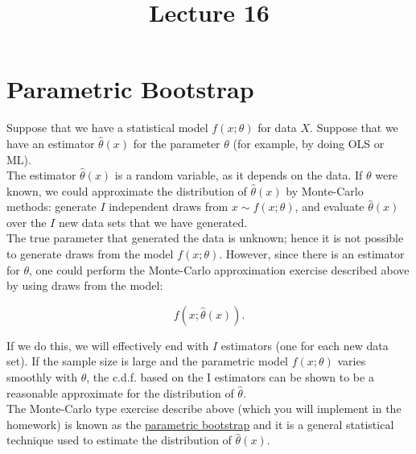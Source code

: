 \documentclass[12] {article}
\begin{document}
\onehalfspace

\title{Lecture 16}
\date{}
\maketitle


\section{Parametric Bootstrap}

Suppose that we have a statistical model $f(x; \theta)$ for data $X$. Suppose that we have an estimator $\widehat{\theta}(x)$ for the parameter $\theta$ (for example, by doing OLS or ML). \\

The estimator $\widehat{\theta}(x)$ is a random variable, as it depends on the data. If $\theta$ were known, we could approximate the distribution of $\widehat{\theta}(x)$ by Monte-Carlo methods: generate $I$ independent draws from $x \sim f(x;\theta)$, and evaluate $\widehat{\theta}(x)$ over the $I$ new data sets that we have generated.  \\


The true parameter that generated the data is unknown; hence it is not possible to generate draws from the model $f(x;\theta)$. However, since there is an estimator for $\theta$, one could perform the Monte-Carlo approximation exercise described above by using draws from the model:

\[ f(x; \widehat{\theta}(x)).\]

If we do this, we will effectively end with $I$ estimators (one for each new data set). If the sample size is large and the parametric model $f(x;\theta)$ varies smoothly with $\theta$, the c.d.f. based on the I estimators can be shown to be a reasonable approximate for the distribution of $\widehat{\theta}$. \\

The Monte-Carlo type exercise describe above (which you will implement in the homework) is known as the \underline{parametric bootstrap} and it is a general statistical technique used to estimate the distribution of $\widehat{\theta}(x)$. 




 
 
 




 
\end{document}
